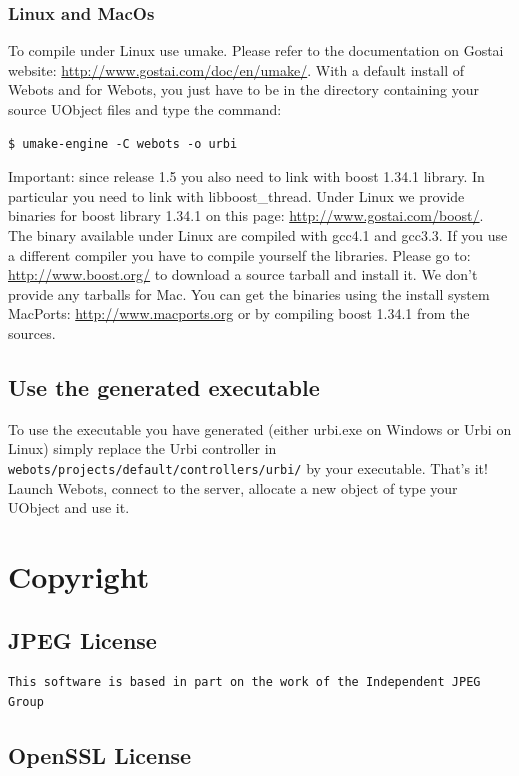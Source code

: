 \subsubsection{Linux and MacOs}
\label{webots.ownuobjects.compile.linux}%

To compile under Linux use umake. Please refer to the documentation on
Gostai website: \url{http://www.gostai.com/doc/en/umake/}.  With a
default install of Webots and \urbi for Webots, you just have to be in
the directory containing your source UObject files and type the
command:

\begin{lstlisting}
$ umake-engine -C webots -o urbi
\end{lstlisting}


Important: since release 1.5 you also need to link with boost 1.34.1
library.  In particular you need to link with libboost\_thread. Under
Linux we provide binaries for boost library 1.34.1 on this page:
\url{http://www.gostai.com/boost/}. The binary available under Linux
are compiled with gcc4.1 and gcc3.3. If you use a different compiler
you have to compile yourself the libraries. Please go to:
\url{http://www.boost.org/} to download a source tarball and install
it.  We don't provide any tarballs for Mac. You can get the binaries
using the install system MacPorts: \url{http://www.macports.org} or by
compiling boost 1.34.1 from the sources.


\subsection{Use the generated executable}
\label{webots.ownuobjects.use}%

To use the executable you have generated (either urbi.exe on Windows
or Urbi on Linux) simply replace the Urbi controller in
\nolinkurl{webots/projects/default/controllers/urbi/} by your
executable. That's it! Launch Webots, connect to the \urbi server,
allocate a new object of type your UObject and use it.

\section{Copyright}
\label{webots.copyright}%



\subsection{JPEG License}

\begin{lstlisting}[language={},basicstyle=\ttfamily\footnotesize]
This software is based in part on the work of the Independent JPEG Group
\end{lstlisting}

\subsection{OpenSSL License}



